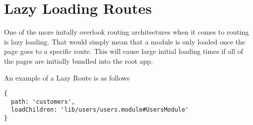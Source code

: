 \maketitle{}
\section{ Lazy Loading Routes }
One of the more initally overlook routing architectures when it comes to routing
is lazy loading. That would simply mean that a module is only loaded once
the page goes to a specific route. This will cause large initial loading times
if all of the pages are initially bundled into the root app.

An example of a Lazy Route is as follows
\begin{lstlisting}
{
  path: 'customers',
  loadChildren: 'lib/users/users.module#UsersModule'
}
\end{lstlisting}
